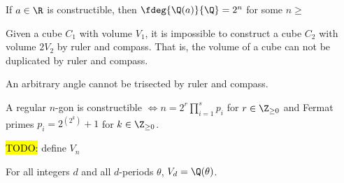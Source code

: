 \documentclass[a4paper]{article}
\begin{document}
\begin{tcorollary}
  If \( a\in\R \) is constructible, then \( \fdeg{\Q(a)}{\Q}=2^n \) for some \( n\geq  \)
\end{tcorollary}

\begin{tcorollary}
  Given a cube \( C_1 \) with volume \( V_1 \), it is impossible to construct a cube \( C_2 \) with volume \( 2V_2 \) by ruler and compass.
  That is, the volume of a cube can not be duplicated by ruler and compass.
\end{tcorollary}

\begin{tcorollary}
  An arbitrary angle cannot be trisected by ruler and compass.
\end{tcorollary}

\begin{ttheorem}
  A regular \( n \)-gon is constructible \( \iff n=2^r \prod_{i=1}^s p_i \) for \( r\in\Z_{\geq 0} \) and Fermat primes \( p_i = 2^{\left( 2^k \right)}+1 \) for \( k\in \Z_{\geq 0} \).
\end{ttheorem}

\hl{TODO:} define \( V_n \)

\begin{tlemma}
  For all integers \( d \) and all \( d \)-periods \( \theta \), \( V_d = \Q(\theta) \).
\end{tlemma}
\end{document}

